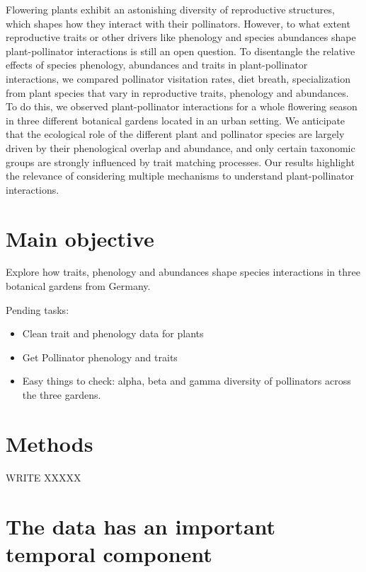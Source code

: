 \documentclass[
  letterpaper,
  DIV=11,
  numbers=noendperiod]{scrartcl}
\begin{document}
Flowering plants exhibit an astonishing diversity of reproductive
structures, which shapes how they interact with their pollinators.
However, to what extent reproductive traits or other drivers like
phenology and species abundances shape plant-pollinator interactions is
still an open question. To disentangle the relative effects of species
phenology, abundances and traits in plant-pollinator interactions, we
compared pollinator visitation rates, diet breath, specialization from
plant species that vary in reproductive traits, phenology and
abundances. To do this, we observed plant-pollinator interactions for a
whole flowering season in three different botanical gardens located in
an urban setting. We anticipate that the ecological role of the
different plant and pollinator species are largely driven by their
phenological overlap and abundance, and only certain taxonomic groups
are strongly influenced by trait matching processes. Our results
highlight the relevance of considering multiple mechanisms to understand
plant-pollinator interactions.

\section{Main objective}\label{main-objective}

Explore how traits, phenology and abundances shape species interactions
in three botanical gardens from Germany.

Pending tasks:

\begin{itemize}
\item
  Clean trait and phenology data for plants
\item
  Get Pollinator phenology and traits
\item
  Easy things to check: alpha, beta and gamma diversity of pollinators
  across the three gardens.
\end{itemize}

\section{Methods}\label{methods}

WRITE XXXXX

\section{The data has an important temporal
component}\label{the-data-has-an-important-temporal-component}
\end{document}
